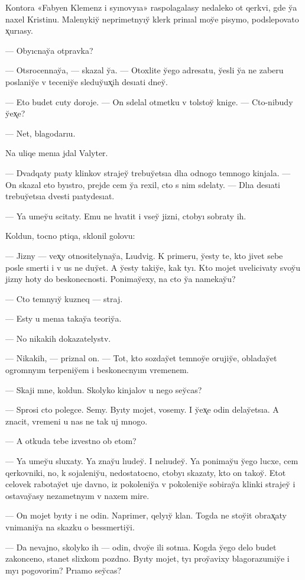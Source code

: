 \documentclass[10pt]{book}
\begin{document}
Kontora «Fabyen Klemenz i syınovyıa» raspolagalasy nedaleko ot qerkvi, gde y̆a naxel Kristinu. Malenykiy̆ neprimetnyıy̆ klerk prinıal moy̆e pisymo, podslepovato x̨urıasy.

— Obyıcnay̆a otpravka?

— Otsrocennay̆a, — skazal y̆a. — Otoxlite y̆ego adresatu, y̆esli y̆a ne zaberu poslaniy̆e v teceniy̆e sleduy̆ux̨ih desıati dney̆.

— Eto budet cuty doroje. — On sdelal otmetku v tolstoy̆ knige. — Cto-nibudy y̆ex̨e?

— Net, blagodarıu.

Na uliqe menıa jdal Valyter.

— Dvadqaty pıaty klinkov strajey̆ trebuy̆etsıa dlıa odnogo temnogo kinjala. — On skazal eto byıstro, prejde cem y̆a rexil, cto s nim sdelaty. — Dlıa desıati trebuy̆etsıa dvesti pıatydesıat.

— Ya umey̆u scitaty. Emu ne hvatit i vsey̆ jizni, ctobyı sobraty ih.

Koldun, tocno ptiqa, sklonil golovu:

— Jizny — vex̨y otnositelynay̆a, Lıudvig. K primeru, y̆esty te, kto jivet sebe posle smerti i v us ne duy̆et. A y̆esty takiy̆e, kak tyı. Kto mojet uvelicivaty svoy̆u jizny hoty do beskonecnosti. Ponimay̆exy, na cto y̆a namekay̆u?

— Cto temnyıy̆ kuzneq — straj.

— Esty u menıa takay̆a teoriy̆a.

— No nikakih dokazatelystv.

— Nikakih, — priznal on. — Tot, kto sozday̆et temnoy̆e orujiy̆e, obladay̆et ogromnyım terpeniy̆em i beskonecnyım vremenem.

— Skaji mne, koldun. Skolyko kinjalov u nego sey̆cas?

— Sprosi cto polegce. Semy. Byıty mojet, vosemy. I y̆ex̨e odin delay̆etsıa. A znacit, vremeni u nas ne tak uj mnogo.

— A otkuda tebe izvestno ob etom?

— Ya umey̆u sluxaty. Ya znay̆u lıudey̆. I nelıudey̆. Ya ponimay̆u y̆ego lucxe, cem qerkovniki, no, k sojaleniy̆u, nedostatocno, ctobyı skazaty, kto on takoy̆. Etot celovek rabotay̆et uje davno, iz pokoleniy̆a v pokoleniy̆e sobiray̆a klinki strajey̆ i ostavay̆asy nezametnyım v naxem mire.

— On mojet byıty i ne odin. Naprimer, qelyıy̆ klan. Togda ne stoy̆it obrax̨aty vnimaniy̆a na skazku o bessmertiy̆i.

— Da nevajno, skolyko ih — odin, dvoy̆e ili sotnıa. Kogda y̆ego delo budet zakonceno, stanet slixkom pozdno. Byıty mojet, tyı proy̆avixy blagorazumiy̆e i myı pogovorim? Prıamo sey̆cas?
\end{document}
